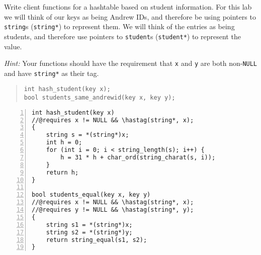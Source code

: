 \begin{part}
  Write client functions for a hashtable based on student
  information. For this lab we will think of our keys as being
  Andrew IDs, and therefore be using pointers to
  \lstinline'string's (\lstinline'string*') to represent them. We will
  think of the entries as being students, and therefore
  use pointers to \lstinline'student's (\lstinline'student*') to represent
  the value.

  \emph{Hint:} Your functions should have the requirement that
  \lstinline'x' and \lstinline'y' are both non-\lstinline'NULL' and
  have \lstinline'string*' as their tag.
\begin{quote}
\begin{lstlisting}
int hash_student(key x);
bool students_same_andrewid(key x, key y);
\end{lstlisting}
\end{quote}

\begin{solution}
\begin{lstlisting}[numbers=left, name="rollcall"]
int hash_student(key x)
//@requires x != NULL && \hastag(string*, x);
{
    string s = *(string*)x;
    int h = 0;
    for (int i = 0; i < string_length(s); i++) {
        h = 31 * h + char_ord(string_charat(s, i));
    }
    return h;
}

bool students_equal(key x, key y)
//@requires x != NULL && \hastag(string*, x);
//@requires y != NULL && \hastag(string*, y);
{
    string s1 = *(string*)x;
    string s2 = *(string*)y;
    return string_equal(s1, s2);
}
\end{lstlisting}
\end{solution}
\end{part}

